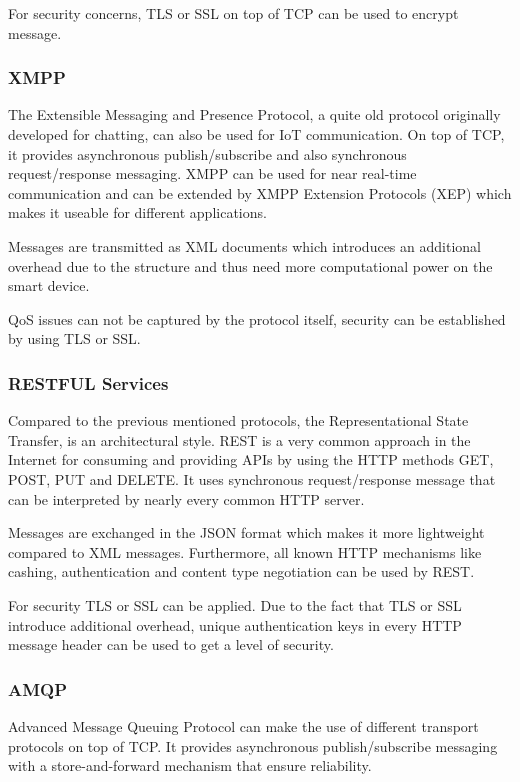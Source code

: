 For security concerns, TLS or SSL on top of TCP can be used to encrypt message.

\subsubsection{XMPP}
The Extensible Messaging and Presence Protocol, a quite old protocol originally developed for chatting, can also be used for IoT communication. On top of TCP, it provides asynchronous publish/subscribe and also synchronous request/response messaging. XMPP can be used for near real-time communication and can be extended by XMPP Extension Protocols (XEP) which makes it useable for different applications.

Messages are transmitted as XML documents which introduces an additional overhead due to the structure and thus need more computational power on the smart device.

QoS issues can not be captured by the protocol itself, security can be established by using TLS or SSL.

\subsubsection{RESTFUL Services}
Compared to the previous mentioned protocols, the Representational State Transfer, is an architectural style. REST is a very common approach in the Internet for consuming and providing APIs by using the HTTP methods GET, POST, PUT and DELETE. It uses synchronous request/response message that can be interpreted by nearly every common HTTP server.

Messages are exchanged in the JSON format which makes it more lightweight compared to XML messages. Furthermore, all known HTTP mechanisms like cashing, authentication and content type negotiation can be used by REST.

For security TLS or SSL can be applied. Due to the fact that TLS or SSL introduce additional overhead, unique authentication keys in every HTTP message header can be used to get a level of security.

\subsubsection{AMQP}
Advanced Message Queuing Protocol can make the use of different transport protocols on top of TCP. It provides asynchronous publish/subscribe messaging with a store-and-forward mechanism that ensure reliability. 

